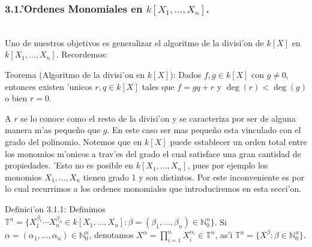 \documentclass[10pt]{beamer}
\renewcommand{\T}{\mathbb{T}^n}
\renewcommand{\N}{\mathbb{N}}
\begin{document}
\begin{frame}
\frametitle{3.1.'Ordenes Monomiales en $k[X_1,...,X_n]$.}\\
Uno de nuestros objetivos es generalizar el algoritmo de la divisi'on de $k[X]$ en $k[X_1,...,X_n]$. Recordemos:\\ 
\begin{block}{Teorema (Algoritmo de la divisi'on en $k[X]$):}
Dados $f,g\in k[X]$ con $g \not = 0$, entonces existen 'unicos $r,q \in k[X]$ tales que $f=gq+r$ y $\deg(r)<\deg(g)$ o bien $r=0$.\\
\end{block}
A $r$ se lo conoce como el resto de la divisi'on y se caracteriza por ser de alguna manera m'as peque\~no que $g$. En este caso ser mas peque\~no esta vinculado con el grado del polinomio. Notemos que en $k[X]$ puede establecer un orden total entre los monomios m'onicos a trav'es del grado el cual satisface una gran cantidad de propiedades. 'Esto no es posible en $k[X_1,...,X_n]$, pues por ejemplo los monomios $X_1,...,X_n$ tienen grado 1 y son distintos. Por este inconveniente es por lo cual recurrimos a los ordenes monomiales que introduciremos en esta secci'on.\\
\begin{block}{Definici'on 3.1.1:}
Definimos $\mathbb{T}^n=\{X_1^{\beta _1}\cdots X_n^{\beta _n} \in k[X_1,...,X_n]:\beta =(\beta _1,...,\beta _n )\in \N_{0}^n\}$. Si $\alpha =(\alpha _1,...,\alpha _n) \in \N_0^n$, denotamos $X^{\alpha}=\prod_{i=1}^{n}{X^{\alpha_i}_i}\in \T$, as'i $\T=\{X^{\beta}:\beta \in \N ^n_0\}$.\\
\end{block}
\end{frame}
\end{document}
